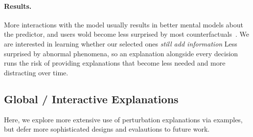 \paragraph{Results.}
More interactions with the model usually results in better mental models about the predictor, and users wold become less surprised by most counterfactuals~\cite{miller}.
We are interested in learning whether our selected ones \emph{still add information}
Less surprised by abnormal phenomena, so an explanation alongside every decision runs the risk of providing explanations that become less needed and more distracting over time.

\subsection{Global / Interactive Explanations}
\label{subsec:global_exp}
Here, we explore more extensive use of perturbation explanations via examples, but defer more sophisticated designs and evalautions to future work.

